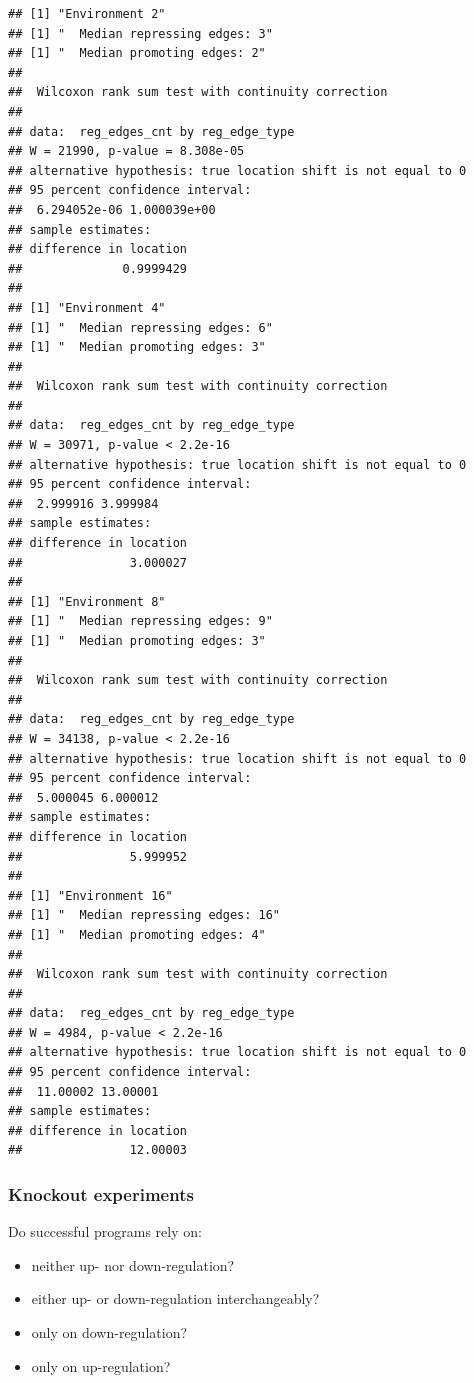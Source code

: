 \documentclass[
]{book}
\providecommand{\tightlist}{%
  \setlength{\itemsep}{0pt}\setlength{\parskip}{0pt}}
\begin{document}
\begin{verbatim}
## [1] "Environment 2"
## [1] "  Median repressing edges: 3"
## [1] "  Median promoting edges: 2"
## 
##  Wilcoxon rank sum test with continuity correction
## 
## data:  reg_edges_cnt by reg_edge_type
## W = 21990, p-value = 8.308e-05
## alternative hypothesis: true location shift is not equal to 0
## 95 percent confidence interval:
##  6.294052e-06 1.000039e+00
## sample estimates:
## difference in location 
##              0.9999429 
## 
## [1] "Environment 4"
## [1] "  Median repressing edges: 6"
## [1] "  Median promoting edges: 3"
## 
##  Wilcoxon rank sum test with continuity correction
## 
## data:  reg_edges_cnt by reg_edge_type
## W = 30971, p-value < 2.2e-16
## alternative hypothesis: true location shift is not equal to 0
## 95 percent confidence interval:
##  2.999916 3.999984
## sample estimates:
## difference in location 
##               3.000027 
## 
## [1] "Environment 8"
## [1] "  Median repressing edges: 9"
## [1] "  Median promoting edges: 3"
## 
##  Wilcoxon rank sum test with continuity correction
## 
## data:  reg_edges_cnt by reg_edge_type
## W = 34138, p-value < 2.2e-16
## alternative hypothesis: true location shift is not equal to 0
## 95 percent confidence interval:
##  5.000045 6.000012
## sample estimates:
## difference in location 
##               5.999952 
## 
## [1] "Environment 16"
## [1] "  Median repressing edges: 16"
## [1] "  Median promoting edges: 4"
## 
##  Wilcoxon rank sum test with continuity correction
## 
## data:  reg_edges_cnt by reg_edge_type
## W = 4984, p-value < 2.2e-16
## alternative hypothesis: true location shift is not equal to 0
## 95 percent confidence interval:
##  11.00002 13.00001
## sample estimates:
## difference in location 
##               12.00003
\end{verbatim}

\hypertarget{knockout-experiments}{%
\subsubsection{Knockout experiments}\label{knockout-experiments}}

Do successful programs rely on:

\begin{itemize}
\tightlist
\item
  neither up- nor down-regulation?
\item
  either up- or down-regulation interchangeably?
\item
  only on down-regulation?
\item
  only on up-regulation?
\end{itemize}
\end{document}

